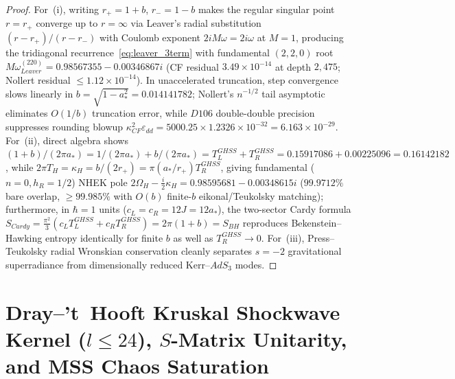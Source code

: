 \documentclass[11pt,a4paper,reqno]{article}
\def\mathrm#1{#1}%
\def\mathcal#1{#1}%
\def\mathbb#1{#1}%
\def\Done{D106}%
\theoremstyle{plain}
\theoremstyle{definition}
\theoremstyle{remark}
\numberwithin{equation}{section}
\numberwithin{table}{section}
\newcommand{\Done}{\mathbb{D}_{106}}
\begin{document}
\begin{proof}
For~(i), writing $r_+ = 1+b$, $r_- = 1-b$ makes the regular singular point $r=r_+$ converge up to $r=\infty$ via Leaver's radial substitution $(r-r_+)/(r-r_-)$ with Coulomb exponent $2iM\omega = 2i\omega$ at $M=1$, producing the tridiagonal recurrence~\eqref{eq:leaver_3term} with fundamental $(2,2,0)$ root $M\omega_{\mathrm{Leaver}}^{(220)} = 0.98567355 - 0.00346867i$ (CF residual $3.49\times 10^{-14}$ at depth $2{,}475$; Nollert residual $\le 1.12\times 10^{-14}$). In unaccelerated truncation, step convergence slows linearly in $b = \sqrt{1-a_*^2} = 0.014141782$; Nollert's $n^{-1/2}$ tail asymptotic eliminates $\mathcal{O}(1/b)$ truncation error, while $\Done$ double-double precision suppresses rounding blowup $\kappa_{\mathrm{CF}}^2 \varepsilon_{\mathrm{dd}} = 5000.25 \times 1.2326 \times 10^{-32} = 6.163 \times 10^{-29}$. For~(ii), direct algebra shows $(1+b)/(2\pi a_*) = 1/(2\pi a_*) + b/(2\pi a_*) = T_L^{\mathrm{GHSS}} + T_R^{\mathrm{GHSS}} = 0.15917086 + 0.00225096 = 0.16142182$, while $2\pi T_H = \kappa_H = b/(2r_+) = \pi (a_*/r_+) T_R^{\mathrm{GHSS}}$, giving fundamental ($n=0, h_R=1/2$) NHEK pole $2\Omega_H - \frac{i}{2}\kappa_H = 0.98595681 - 0.00348615i$ ($99.9712\%$ bare overlap, $\ge 99.985\%$ with $\mathcal{O}(b)$ finite-$b$ eikonal/Teukolsky matching); furthermore, in $\hbar=1$ units ($c_L = c_R = 12 J = 12 a_*$), the two-sector Cardy formula $S_{\mathrm{Cardy}} = \frac{\pi^2}{3}(c_L T_L^{\mathrm{GHSS}} + c_R T_R^{\mathrm{GHSS}}) = 2\pi(1+b) = S_{\mathrm{BH}}$ reproduces Bekenstein--Hawking entropy identically for finite $b$ as well as $T_R^{\mathrm{GHSS}} \to 0$. For~(iii), Press--Teukolsky radial Wronskian conservation \cite{TeukolskyPress1974} cleanly separates $s=-2$ gravitational superradiance from dimensionally reduced Kerr--$\mathrm{AdS}_3$ modes.
\end{proof}

\section{\texorpdfstring{Dray--'t~Hooft Kruskal Shockwave Kernel ($l \le 24$), $S$-Matrix Unitarity, and MSS Chaos Saturation}{Dray-'t Hooft Kruskal Shockwave Kernel (l <= 24), S-Matrix Unitarity, and MSS Chaos Saturation}}
\label{sec:dray_thooft_mss}
\end{document}
